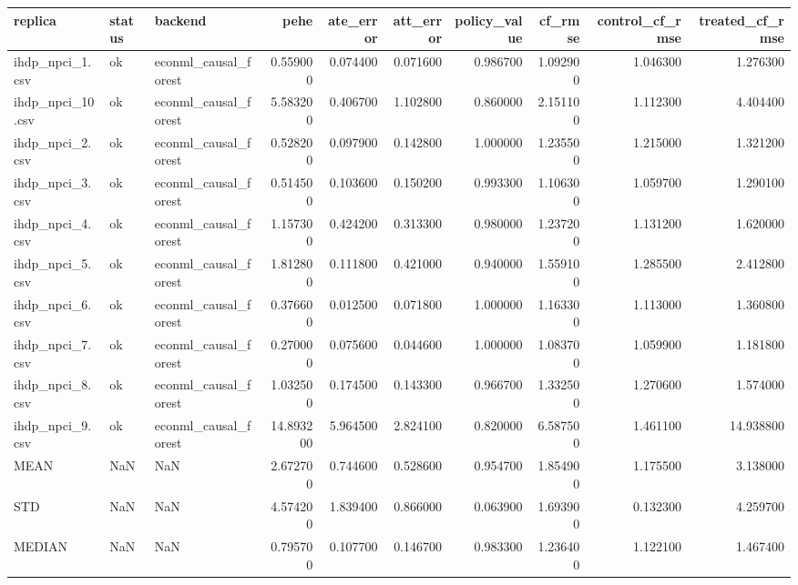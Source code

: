 \begin{tabular}{lllrrrrrrr}
\toprule
replica & status & backend & pehe & ate_error & att_error & policy_value & cf_rmse & control_cf_rmse & treated_cf_rmse \\
\midrule
ihdp_npci_1.csv & ok & econml_causal_forest & 0.559000 & 0.074400 & 0.071600 & 0.986700 & 1.092900 & 1.046300 & 1.276300 \\
ihdp_npci_10.csv & ok & econml_causal_forest & 5.583200 & 0.406700 & 1.102800 & 0.860000 & 2.151100 & 1.112300 & 4.404400 \\
ihdp_npci_2.csv & ok & econml_causal_forest & 0.528200 & 0.097900 & 0.142800 & 1.000000 & 1.235500 & 1.215000 & 1.321200 \\
ihdp_npci_3.csv & ok & econml_causal_forest & 0.514500 & 0.103600 & 0.150200 & 0.993300 & 1.106300 & 1.059700 & 1.290100 \\
ihdp_npci_4.csv & ok & econml_causal_forest & 1.157300 & 0.424200 & 0.313300 & 0.980000 & 1.237200 & 1.131200 & 1.620000 \\
ihdp_npci_5.csv & ok & econml_causal_forest & 1.812800 & 0.111800 & 0.421000 & 0.940000 & 1.559100 & 1.285500 & 2.412800 \\
ihdp_npci_6.csv & ok & econml_causal_forest & 0.376600 & 0.012500 & 0.071800 & 1.000000 & 1.163300 & 1.113000 & 1.360800 \\
ihdp_npci_7.csv & ok & econml_causal_forest & 0.270000 & 0.075600 & 0.044600 & 1.000000 & 1.083700 & 1.059900 & 1.181800 \\
ihdp_npci_8.csv & ok & econml_causal_forest & 1.032500 & 0.174500 & 0.143300 & 0.966700 & 1.332500 & 1.270600 & 1.574000 \\
ihdp_npci_9.csv & ok & econml_causal_forest & 14.893200 & 5.964500 & 2.824100 & 0.820000 & 6.587500 & 1.461100 & 14.938800 \\
MEAN & NaN & NaN & 2.672700 & 0.744600 & 0.528600 & 0.954700 & 1.854900 & 1.175500 & 3.138000 \\
STD & NaN & NaN & 4.574200 & 1.839400 & 0.866000 & 0.063900 & 1.693900 & 0.132300 & 4.259700 \\
MEDIAN & NaN & NaN & 0.795700 & 0.107700 & 0.146700 & 0.983300 & 1.236400 & 1.122100 & 1.467400 \\
\bottomrule
\end{tabular}
